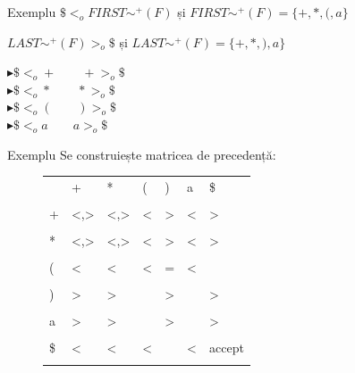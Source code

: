 \documentclass[pdf]{beamer}
\begin{document}
\begin{frame}{Exemplu}
$\$ <_o FIRST\sim^+(F)$ \hspace{1cm} și $FIRST\sim^+(F) = \{ +, *, (, a \}$
\newline

$LAST\sim^+(F) >_o \$$ \hspace{1cm} și $LAST\sim^+(F) = \{ +, *, ), a \}$
\newline

$\blacktriangleright \$ <_o + \qquad + >_o \$$\\
$\blacktriangleright \$ <_o * \qquad * >_o \$$\\
$\blacktriangleright \$ <_o ( \qquad ) >_o \$$\\
$\blacktriangleright \$ <_o a \qquad a >_o \$$
\end{frame}



\begin{frame}{Exemplu}
Se construiește matricea de precedență:
\newline 

\begin{figure}[h]
\centering
\begin{tabular}{ | p{0.5cm} | p{0.5cm} | p{0.5cm} | p{0.5cm} | p{0.5cm} | p{0.5cm} | p{1cm} | }
\hline
	 & +   & *   & ( & ) & a & \$   \\
	 & & & & & & \\
\hline
	+& <,> & <,> & < & > & < & >    \\
	& & & & & & \\
\hline
	*& <,> & <,> & < & > & < & >    \\
	& & & & & & \\
\hline
	(& < & < & < & = & < &   \\
	& & & & & & \\
\hline
	)& > & > &	& > & & >  \\
	& & & & & & \\
\hline
	a& > & > & & > &  	& >  \\
	& & & & & & \\
\hline
	\$& < &	< & < &	& <	& accept  \\
	& & & & & & \\
\hline
\end{tabular}
\end{figure}
\end{frame}
\end{document}
